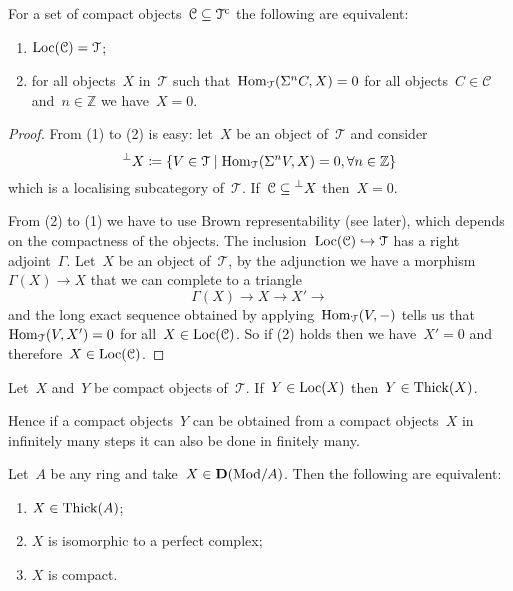 \documentclass[10pt,a4paper]{article}
\begin{document}
\begin{proposition}
  For a set of compact objects~$\mathcal{C}\subseteq\mathcal{T}^{\mathrm{c}}$ the following are equivalent:
  \begin{enumerate}
    \item $\operatorname{Loc}(\mathcal{C})=\mathcal{T}$;
    \item for all objects~$X$ in~$\mathcal{T}$ such that~$\operatorname{Hom}_{\mathcal{T}}(\Sigma^nC,X)=0$ for all objects~$C\in\mathcal{C}$ and~$n\in\mathbb{Z}$ we have~$X=0$.
  \end{enumerate}

  \begin{proof}
    From (1) to (2) is easy: let~$X$ be an object of~$\mathcal{T}$ and consider
    \begin{equation}
      \prescript{\perp}{}{X}\coloneqq\left\{ V\in\mathcal{T}\mid\operatorname{Hom}_{\mathcal{T}}(\Sigma^nV,X)=0,\forall n\in\mathbb{Z} \right\}
    \end{equation}
    which is a localising subcategory of~$\mathcal{T}$. If~$\mathcal{C}\subseteq\prescript{\perp}{}{X}$ then~$X=0$.

    From (2) to (1) we have to use Brown representability (see later), which depends on the compactness of the objects. The inclusion~$\operatorname{Loc}(\mathcal{C})\hookrightarrow\mathcal{T}$ has a right adjoint~$\Gamma$. Let~$X$ be an object of~$\mathcal{T}$, by the adjunction we have a morphism~$\Gamma(X)\to X$ that we can complete to a triangle
    \begin{equation}
      \Gamma(X)\to X\to X'\to
    \end{equation}
    and the long exact sequence obtained by applying~$\operatorname{Hom}_{\mathcal{T}}(V,-)$ tells us that~$\operatorname{Hom}_{\mathcal{T}}(V,X')=0$ for all~$X\in\operatorname{Loc}(\mathcal{C})$. So if (2) holds then we have~$X'=0$ and therefore~$X\in\operatorname{Loc}(\mathcal{C})$.%
  \end{proof}
\end{proposition}
\begin{proposition}
  Let~$X$ and~$Y$ be compact objects of~$\mathcal{T}$. If~$Y\in\operatorname{Loc}(X)$ then~$Y\in\operatorname{Thick}(X)$.
\end{proposition}
Hence if a compact objects~$Y$ can be obtained from a compact objects~$X$ in infinitely many steps it can also be done in finitely many.
\begin{example}
  Let~$A$ be any ring and take~$X\in\mathbf{D}(\mathrm{Mod}/A)$. Then the following are equivalent:
  \begin{enumerate}
    \item $X\in\operatorname{Thick}(A)$;
    \item $X$ is isomorphic to a perfect complex;
    \item $X$ is compact.
  \end{enumerate}
\end{example}
\end{document}
